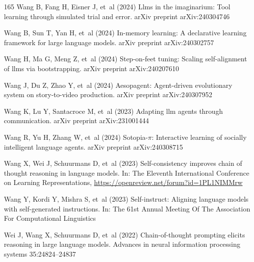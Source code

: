 \documentclass[sn-basic, Numbered]{sn-jnl}%
\theoremstyle{thmstyleone}%
\theoremstyle{thmstyletwo}%
\theoremstyle{thmstylethree}%
\begin{document}
\begin{thebibliography}{165}
Wang B, Fang H, Eisner J, et~al (2024{}) Llms in the imaginarium: Tool learning through simulated trial and error. arXiv preprint arXiv:240304746

Wang B, Sun T, Yan H, et~al (2024{}) In-memory learning: A declarative learning framework for large language models. arXiv preprint arXiv:240302757

Wang H, Ma G, Meng Z, et~al (2024{}) Step-on-feet tuning: Scaling self-alignment of llms via bootstrapping. arXiv preprint arXiv:240207610

Wang J, Du Z, Zhao Y, et~al (2024{}) Aesopagent: Agent-driven evolutionary system on story-to-video production. arXiv preprint arXiv:240307952

Wang K, Lu Y, Santacroce M, et~al (2023{}) Adapting llm agents through communication. arXiv preprint arXiv:231001444

Wang R, Yu H, Zhang W, et~al (2024{}) Sotopia-$\pi$: Interactive learning of socially intelligent language agents. arXiv preprint arXiv:240308715

Wang X, Wei J, Schuurmans D, et~al (2023{}) Self-consistency improves chain of thought reasoning in language models. In: The Eleventh International Conference on Learning Representations, \urlprefix\url{https://openreview.net/forum?id=1PL1NIMMrw}

Wang Y, Kordi Y, Mishra S, et~al (2023{}) Self-instruct: Aligning language models with self-generated instructions. In: The 61st Annual Meeting Of The Association For Computational Linguistics

Wei J, Wang X, Schuurmans D, et~al (2022) Chain-of-thought prompting elicits reasoning in large language models. Advances in neural information processing systems 35:24824--24837


\end{thebibliography}
\end{document}
